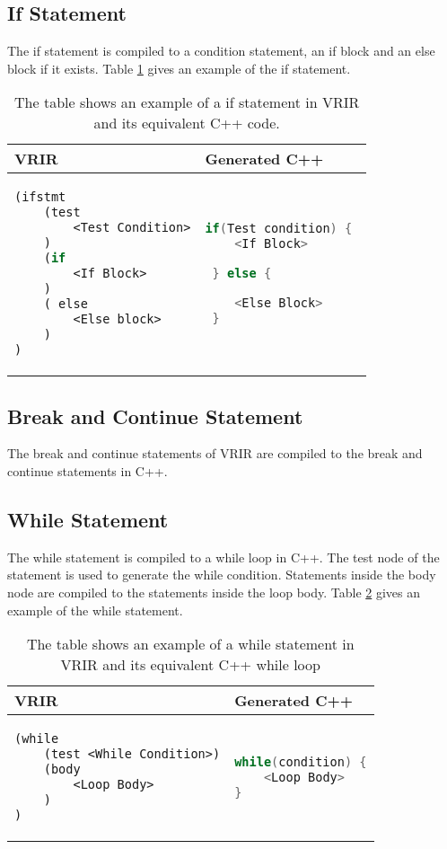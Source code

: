 \subsection{If Statement}
The if statement is compiled to a condition statement, an if block and an else block if it exists.  Table \ref{tab:ifStmt} gives an example of the if statement.
\begin{table}[htbp]
\centering
\begin{tabular}{|l|l|}
\hline

VRIR &  Generated C++ \\
\hline
{
\begin{lstlisting}[language=lisp,frame=none, numbers=none]
(ifstmt
	(test
		<Test Condition>
	)
	(if
		<If Block>
	)	
	( else 
		<Else block>
	)
)
\end{lstlisting}
}
&
{
\begin{lstlisting}[language=c,frame=none, numbers=none]
 if(Test condition) { 
	<If Block>

 } else {

	<Else Block>
 }
\end{lstlisting}
} \\
\hline
\end{tabular}
\caption[If Statement Example]{The table shows an example of a if statement in VRIR and its equivalent C++ code.}
\label{tab:ifStmt}
\end{table}
\subsection{Break and Continue Statement}
The break  and continue statements of VRIR are compiled to the break and continue statements in C++.
\subsection{While Statement}
The while statement is compiled to a while loop in C++. The test node of the statement is used to generate the while condition. Statements inside the body node are compiled to the statements inside the loop body. Table \ref{tab:while} gives an example of the while statement.
\begin{table}[htbp]
\centering
\begin{tabular}{|l|l|}
\hline

VRIR &  Generated C++ \\
\hline
{
\begin{lstlisting}[language=lisp,frame=none, numbers=none]
(while 
	(test <While Condition>)
	(body 
		<Loop Body>
	)
)
\end{lstlisting}
}
&
{
\begin{lstlisting}[language=c,frame=none, numbers=none]
while(condition) {
	<Loop Body>
}
\end{lstlisting}
} \\
\hline
\end{tabular}
\caption[While statement example]{The table shows an example of a while statement in VRIR and its equivalent C++ while loop}
\label{tab:while}
\end{table}
